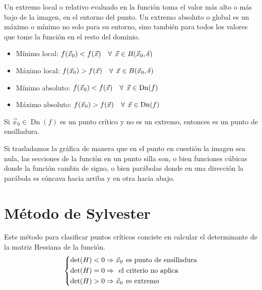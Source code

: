 \documentclass[a5paper,12pt,twoside]{book}
\begin{document}
Un extremo local o relativo evaluado en la función toma el valor más alto o más bajo de la imagen, en el entorno del punto.
Un extremo absoluto o global es un máximo o mínimo no solo para su entorno, sino también para todos los valores que tome la función en el resto del dominio.

\begin{itemize}
    \item Mínimo local: $f(\Vec{x}_0)<f(\Vec{x}) \quad \forall \hspace{1ex} \Vec{x} \in B(\Vec{x}_0, \delta)$

    \item Máximo local: $f(\Vec{x}_0)>f(\Vec{x}) \quad \forall \hspace{1ex} \Vec{x} \in B(\Vec{x}_0, \delta)$

    \item Mínimo absoluto: $f(\Vec{x}_0)<f(\Vec{x}) \quad \forall \hspace{1ex} \Vec{x} \in \operatorname{Dn}(f)$

    \item Máximo absoluto: $f(\Vec{x}_0)>f(\Vec{x}) \quad \forall \hspace{1ex} \Vec{x} \in \operatorname{Dn}(f)$
\end{itemize}

Si $\Vec{x}_0 \in \operatorname{Dn}(f)$ es un punto crítico y no es un extremo, entonces es un punto de ensilladura.

Si trasladamos la gráfica de manera que en el punto en cuestión la imagen sea nula, las secciones de la función en un punto silla son, o bien funciones cúbicas donde la función cambia de signo, o bien parábolas donde en una dirección la parábola es cóncava hacia arriba y en otra hacia abajo.


\section{Método de Sylvester}

Este método para clasificar puntos críticos conciste en calcular el determinante de la matriz Hessiana de la función.
\begin{equation*}
    \left\{
    \begin{aligned}
        \operatorname{det}(H) < 0 & \Rightarrow \Vec{x}_0 \hspace{1ex} \textrm{es punto de ensilladura}
        \\
        \operatorname{det}(H) = 0 &\Rightarrow \hspace{1ex} \textrm{el criterio no aplica}
        \\
        \operatorname{det}(H) > 0 &\Rightarrow \Vec{x}_0 \hspace{1ex} \textrm{es extremo}
    \end{aligned}
    \right.
\end{equation*}
\end{document}
